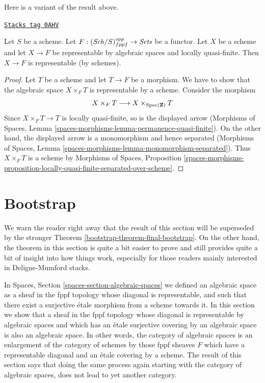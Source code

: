 Here is a variant of the result above.

\begin{lemma}
\label{bootstrap-lemma-bootstrap-locally-quasi-finite}
\href{https://stacks.math.columbia.edu/tag/0AHV}{\texttt{Stacks tag 0AHV}}

Let $S$ be a scheme. Let $F : (\mathit{Sch}/S)_{fppf}^{opp} \to \textit{Sets}$ be a
functor. Let $X$ be a scheme and let $X \to F$ be representable by algebraic
spaces and locally quasi-finite. Then $X \to F$ is representable
(by schemes).
\end{lemma}

\begin{proof}
Let $T$ be a scheme and let $T \to F$ be a morphism. We have to show that
the algebraic space $X \times_F T$ is representable by a scheme. Consider
the morphism
$$
X \times_F T  \longrightarrow X \times_{\operatorname{Spec}(\mathbf{Z})} T
$$
Since $X \times_F T \to T$ is locally quasi-finite, so is the displayed
arrow (Morphisms of Spaces, Lemma
\ref{spaces-morphisms-lemma-permanence-quasi-finite}).
On the other hand, the displayed arrow is a monomorphism
and hence separated (Morphisms of Spaces, Lemma
\ref{spaces-morphisms-lemma-monomorphism-separated}).
Thus $X \times_F T$ is a scheme by Morphisms of Spaces, Proposition
\ref{spaces-morphisms-proposition-locally-quasi-finite-separated-over-scheme}.
\end{proof}

\section{Bootstrap}
\label{bootstrap-section-bootstrap}
We warn the reader right away that the result of this section will
be superseded by the stronger
Theorem \ref{bootstrap-theorem-final-bootstrap}.
On the other hand, the theorem in this section is quite a bit easier to
prove and still provides quite a bit of insight into how things work,
especially for those readers mainly interested in Deligne-Mumford
stacks.

\medskip\noindent
In
Spaces, Section \ref{spaces-section-algebraic-spaces}
we defined an algebraic space as a sheaf in the fppf topology whose
diagonal is representable, and such that there exist a surjective \'etale
morphism from a scheme towards it. In this section we show that
a sheaf in the fppf topology whose diagonal is representable by algebraic
spaces and which has an \'etale surjective covering by an algebraic space
is also an algebraic space.
In other words, the category of algebraic spaces is an enlargement of the
category of schemes by those fppf sheaves $F$ which have a representable
diagonal and an \'etale covering by a scheme. The
result of this section says that doing the same process again starting with
the category of algebraic spaces, does not lead to yet another category.

